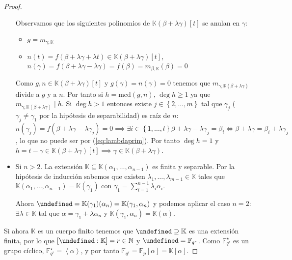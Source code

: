 \documentclass[10pt, spanish]{report}
\theoremstyle{definition}
\theoremstyle{custom}
\theoremstyle{remark}
\newcommand{\N}{\mathbb{N}}
\newcommand{\F}{\mathbb{F}}
\newcommand{\K}{\mathbb{K}}
\let\L\undefined
\newcommand{\L}{\mathbb{L}}
\newcommand{\mcd}[1]{\text{mcd}(#1)}
\renewcommand{\geq}{\geqslant}
\newcommand{\fecha}[1]{\marginpar{\underline{\footnotesize{#1}}}}
\begin{document}
\begin{proof}
\begin{itemize}
            \fecha{25/03}
            Observamos que los siguientes polinomios de
            $\K(\beta+\lambda\gamma)[t]$ se anulan en $\gamma$:
            \begin{itemize}
                \item $g=m_{\gamma,\K}$ 
                \item $n(t)=f(\beta+\lambda\gamma+\lambda
                    t)\in\K(\beta+\lambda\gamma)[t]$,
                    $n(\gamma)=f(\beta+\lambda\gamma-\lambda\gamma)=f(\beta)=m_{\beta,\K}(\beta)=0$ 
            \end{itemize}
            Como $g, n\in\K(\beta+\lambda\gamma)[t]$ y $g(\gamma)=n(\gamma)=0$
            tenemos que $m_{\gamma, \K(\beta+\lambda\gamma)}$ divide a $g$ y a
            $n$. Por tanto si $h=\mcd{g,n}$, $\deg{h}\geq1$ ya que
            $m_{\gamma,\K(\beta+\lambda\gamma)}\mid h$. Si $\deg{h}>1$ entonces
            existe $j\in\left\{ 2,\ldots,m \right\}$ tal que $\gamma_j$
            ($\gamma_j\neq \gamma_1$ por la hipótesis de separabilidad) es raíz
            de $n$: 
            $n(\gamma_j)=f(\beta+\lambda\gamma-\lambda\gamma_j)=0 \implies
            \exists i\in\left\{ 1,\ldots,l \right\}
            \beta+\lambda\gamma-\lambda\gamma_j=\beta_i \Leftrightarrow
            \beta+\lambda\gamma=\beta_i+\lambda\gamma_j$, lo que no puede ser
            por (\ref{eq:lambdaprim}). Por tanto $\deg{h}=1$ y
            $h=t-\gamma\in\K(\beta+\lambda\gamma)[t]\implies
            \gamma\in\K(\beta+\lambda\gamma)$.    
        \item Si $n>2$. La extensión $\K\subseteq\K(\alpha_1,\ldots,
            \alpha_{n-1})$ es finita y separable. Por la hipótesis de inducción
            sabemos que existen $\lambda_1,\ldots,\lambda_{m-1}\in\K$ tales que
            $\K(\alpha_1,\ldots,\alpha_{n-1})=\K(\gamma_1)$ con
            $\gamma_1=\sum_{i=1}^{n-1}\lambda_i\alpha_i$.

            Ahora $\L=\K(\gamma_1)(\alpha_n)=\K(\gamma_1,\alpha_n)$ y podemos
            aplicar el caso $n=2$: $\exists \lambda\in\K$ tal que
            $\alpha=\gamma_1+\lambda\alpha_n$ y
            $\K(\gamma_1,\alpha_n)=\K(\alpha)$.   
    \end{itemize}

    Si ahora $\K$ es un cuerpo finito tenemos que $\L\supseteq\K$ es una
    extensión finita, por lo que $\left[ \L:\K \right] =r\in\N$ y $\L=\F_{q^r}$.   
    Como $\F_{q^r}^\star$ es un grupo cíclico, $\F_{q^r}^\star= \left<
    \alpha\right>$, y por tanto $\F_{q^r}=\F_p[\alpha]=\K[\alpha]$. 
\end{proof}
\end{document}
